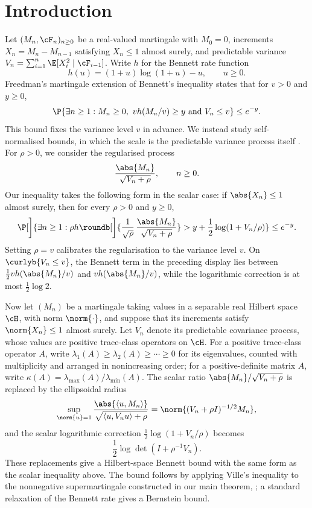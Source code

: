 \documentclass[11pt]{article}
\let\cref\zcref
\begin{document}
\section{Introduction}
Let $(M_n,\cF_n)_{n\ge0}$ be a real-valued martingale with $M_0=0$, increments
$X_n=M_n-M_{n-1}$ satisfying $X_n\le1$ almost surely, and predictable variance
$V_n=\sum_{i=1}^n\E[X_i^2\mid\cF_{i-1}]$. Write $h$ for the Bennett rate function
\[
  h(u)=(1+u)\log(1+u)-u,\qquad u\ge0.
\]
Freedman's martingale extension of Bennett's inequality
\citep{bennett1962probability,freedman1975tail} states that for $v>0$ and $y \geq 0$,
\[
 \P{\exists n\ge1: M_n\ge0,\ v h(M_n/v)\ge y \text{ and } V_n\le v}
  \le e^{-y}.
\]
This bound fixes the variance level $v$ in advance. We instead study self-normalised bounds, in which the scale is the predictable variance process itself \citep{delapena1999general,delapena2004selfnormalized,delapena2009selfnormalized}. For $\rho>0$, we consider the regularised process
\[
  \frac{\abs{M_n}}{\sqrt{V_n+\rho}},\qquad n\geq0.
\]
Our inequality takes the following form in the scalar case: if $\abs{X_n}\leq1$ almost surely, then for every $\rho>0$ and $y\geq0$,
\[
  \P[\bigg]{\exists n\geq1:\rho h\roundb[\bigg]{\frac{1}{\sqrt{\rho}}\,\frac{\abs{M_n}}{\sqrt{V_n+\rho}}}>y+\frac12\log(1+V_n/\rho)}\leq e^{-y}.
\]
Setting $\rho=v$ calibrates the regularisation to the variance level $v$. On $\curlyb{V_n\leq v}$, the Bennett term in the preceding display lies between $\frac12v h(\abs{M_n}/v)$ and $v h(\abs{M_n}/v)$, while the logarithmic correction is at most $\frac12\log2$.

Now let $(M_n)$ be a martingale taking values in a separable real Hilbert space $\cH$, with norm $\norm{\cdot}$, and suppose that its increments satisfy $\norm{X_n}\leq1$ almost surely. Let $V_n$ denote its predictable covariance process, whose values are positive trace-class operators on $\cH$. For a positive trace-class operator $A$, write $\lambda_1(A)\geq\lambda_2(A)\geq\cdots\geq0$ for its eigenvalues, counted with multiplicity and arranged in nonincreasing order; for a positive-definite matrix $A$, write $\kappa(A)=\lambda_{\max}(A)/\lambda_{\min}(A)$. The scalar ratio $\abs{M_n}/\sqrt{V_n+\rho}$ is replaced by the ellipsoidal radius
\[
  \sup_{\norm{u}=1}\frac{\abs{\langle u,M_n\rangle}}{\sqrt{\langle u,V_nu\rangle+\rho}}=\norm{(V_n+\rho I)^{-1/2}M_n},
\]
and the scalar logarithmic correction $\frac12\log(1+V_n/\rho)$ becomes
\[
  \frac12\log\det(I+\rho^{-1}V_n).\]
These replacements give a Hilbert-space Bennett bound with the same form as the scalar inequality above. The bound follows by applying Ville's inequality to the nonnegative supermartingale constructed in our main theorem, \cref{thm:bennett-logdet-potential}; a standard relaxation of the Bennett rate gives a Bernstein bound.
\end{document}
